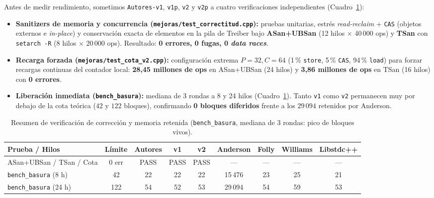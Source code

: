 \documentclass[11pt,a4paper]{article}
\begin{document}
Antes de medir rendimiento, sometimos \texttt{Autores-v1}, \texttt{v1p}, \texttt{v2} y \texttt{v2p} a cuatro verificaciones independientes (Cuadro~\ref{tab:verificacion}):
\begin{itemize}
  \item \textbf{Sanitizers de memoria y concurrencia (\texttt{mejoras/test\_correctitud.cpp}):} pruebas unitarias, estrés \emph{read-reclaim} + \texttt{CAS} (objetos externos e \emph{in-place}) y conservación exacta de elementos en la pila de Treiber bajo \textbf{ASan+UBSan} (12 hilos $\times$ 40\,000 ops) y \textbf{TSan} con \texttt{setarch -R} (8 hilos $\times$ 20\,000 ops). Resultado: \textbf{0 errores, 0 fugas, 0 \emph{data races}}.
  \item \textbf{Recarga forzada (\texttt{mejoras/test\_cota\_v2.cpp}):} configuración extrema $P=32, C=64$ (1\,\% \texttt{store}, 5\,\% \texttt{CAS}, 94\,\% \texttt{load}) para forzar recargas continuas del contador local: \textbf{28{,}45 millones de ops} en ASan+UBSan (24 hilos) y \textbf{3{,}86 millones de ops} en TSan (16 hilos) con \textbf{0 errores}.
  \item \textbf{Liberación inmediata (\texttt{bench\_basura}):} mediana de 3 rondas a 8 y 24 hilos (Cuadro~\ref{tab:verificacion}). Tanto \texttt{v1} como \texttt{v2} permanecen muy por debajo de la cota teórica ($42$ y $122$ bloques), confirmando \textbf{0 bloques diferidos} frente a los $29\,094$ retenidos por Anderson.
\end{itemize}

\begin{table}[H]
\centering
\caption{Resumen de verificación de corrección y memoria retenida (\texttt{bench\_basura}, mediana de 3 rondas: pico de bloques vivos).}
\label{tab:verificacion}
\footnotesize
\begin{tabular}{@{}l c c c c c c c c@{}}
\toprule
\textbf{Prueba / Hilos} & \textbf{Límite} & \textbf{Autores} & \textbf{v1} & \textbf{v2} & \textbf{Anderson} & \textbf{Folly} & \textbf{Williams} & \textbf{Libstdc++} \\
\midrule
ASan+UBSan / TSan / Cota & 0 err & PASS & PASS & PASS & — & — & — & — \\
\texttt{bench\_basura} (8 h) & 42 & 22 & 22 & 22 & 15\,476 & 23 & 25 & 21 \\
\texttt{bench\_basura} (24 h) & 122 & 54 & 52 & 53 & 29\,094 & 54 & 59 & 53 \\
\bottomrule
\end{tabular}
\end{table}
\end{document}
